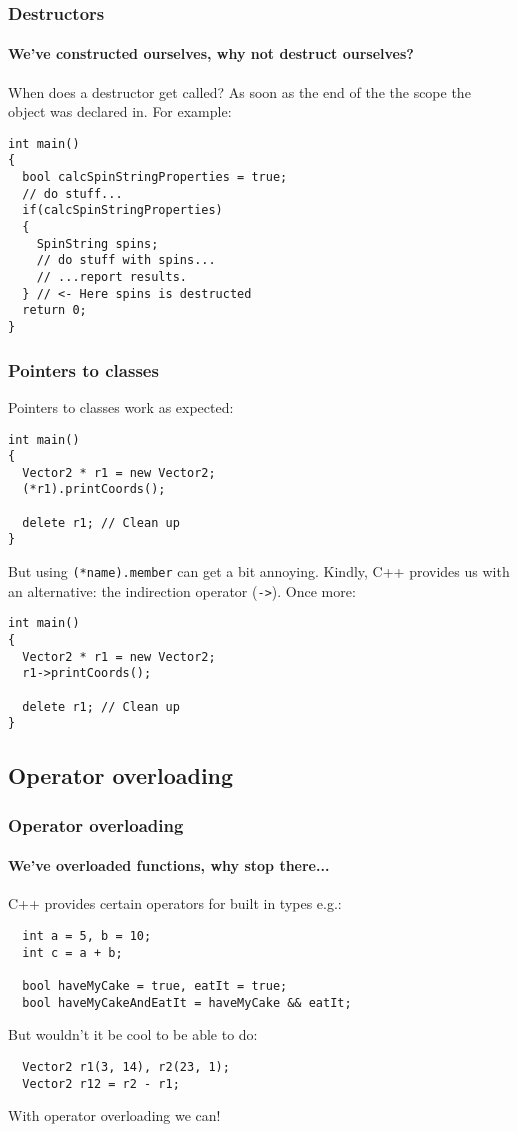 \documentclass{beamer}
\begin{document}
\begin{frame}[fragile]
  \frametitle{Destructors}
  \framesubtitle{We've constructed ourselves, why not destruct ourselves?}
  When does a destructor get called?  As soon as the end of the the scope the object was declared in.
  \newline\pause
  For example:
  \begin{lstlisting}
int main()
{
  bool calcSpinStringProperties = true;
  // do stuff...
  if(calcSpinStringProperties)
  {
    SpinString spins;
    // do stuff with spins...
    // ...report results.
  } // <- Here spins is destructed
  return 0;
}
  \end{lstlisting}
  \pause
\end{frame}

\begin{frame}[fragile]
  \frametitle{Pointers to classes}
  
  Pointers to classes work as expected:
  \begin{lstlisting}
int main()
{
  Vector2 * r1 = new Vector2;
  (*r1).printCoords();
  
  delete r1; // Clean up
}
  \end{lstlisting}
  \pause
  But using \texttt{(*name).member} can get a bit annoying.  Kindly, C++ provides us with an alternative: the indirection operator (\texttt{->}).\pause{}  Once more:
  \begin{lstlisting}
int main()
{
  Vector2 * r1 = new Vector2;
  r1->printCoords();
  
  delete r1; // Clean up
}  
  \end{lstlisting}

\end{frame}

\subsection{Operator overloading}

\begin{frame}[fragile]
  \frametitle{Operator overloading}
  \framesubtitle{We've overloaded functions, why stop there...}
  
  C++ provides certain operators for built in types e.g.:
  \begin{lstlisting}
  int a = 5, b = 10;
  int c = a + b;
  
  bool haveMyCake = true, eatIt = true;
  bool haveMyCakeAndEatIt = haveMyCake && eatIt;
  \end{lstlisting}
  But wouldn't it be cool to be able to do:
  \begin{lstlisting}
  Vector2 r1(3, 14), r2(23, 1);
  Vector2 r12 = r2 - r1;
  \end{lstlisting}
  With operator overloading we can!

\end{frame}
\end{document}
